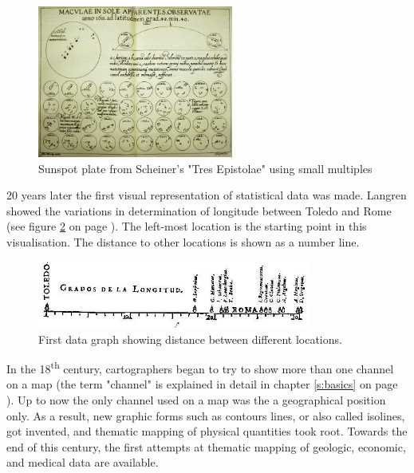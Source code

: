 \begin{figure}[!htb]
\centering
\includegraphics[height=5cm,keepaspectratio]{images/history/small-multiples.png}
\caption[
    Sunspot plate from Scheiner's "Tres Epistolae" using small multiples, Urldate: 07.2016 \newline
\small\texttt{\url{http://cnx.rice.edu/content/m11970/latest/tres_epistolae.gif}}
]{Sunspot plate from Scheiner's "Tres Epistolae" using small multiples}
\label{fig:small-multiples}
\end{figure}

20 years later the first visual representation of statistical data was made. Langren showed the variations in determination of longitude between Toledo and Rome (see figure \ref{fig:langren} on page \pageref{fig:langren}). The left-most location is the starting point in this visualisation. The distance to other locations is shown as a number line.

\begin{figure}[!htb]
\centering
\includegraphics[width=0.8\textwidth,keepaspectratio]{images/history/langren.jpg}
\caption[
    First data graph showing variations in determination of longitude between Toledo and Rome, Urldate: 07.2016 \newline
\small\texttt{\url{http://datavis.ca/milestones//admin/uploads/images/tufte/langren.jpg}}
]{First data graph showing distance between different locations.}
\label{fig:langren}
\end{figure}

In the 18\textsuperscript{th} century, cartographers began to try to show more than one channel on a map (the term "channel" is explained in detail in chapter \ref{s:basics} on page \pageref{s:basics}). Up to now the only channel used on a map was the a geographical position only. As a result, new graphic forms such as contours lines, or also called isolines, got invented, and thematic mapping of physical quantities took root. Towards the end of this century, the first attempts at thematic mapping of geologic, economic, and medical data are available.

